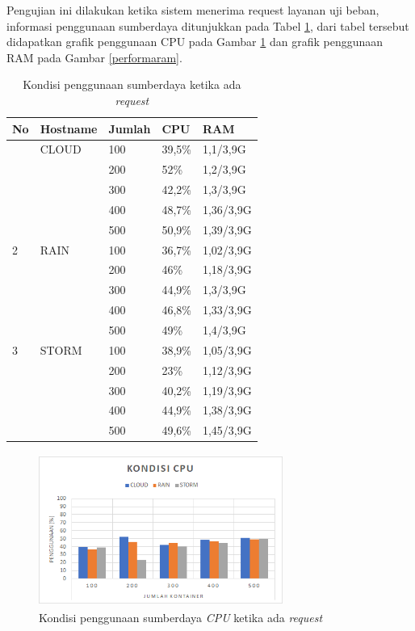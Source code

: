 				Pengujian ini dilakukan ketika sistem menerima request layanan uji beban, informasi penggunaan sumberdaya ditunjukkan pada Tabel \ref{sdhasilperforma}, dari tabel tersebut didapatkan grafik penggunaan CPU pada Gambar \ref{performacpu} dan grafik penggunaan RAM pada Gambar \ref{performaram}.
				\begin{longtable}{|p{}|p{}|p{}|p{}|p{}|}
					\caption{Kondisi penggunaan sumberdaya ketika ada \textit{request}} \label{sdhasilperforma} \\
					\hline
					\textbf{No} & \textbf{Hostname} & \textbf{Jumlah} & \textbf{CPU} & \textbf{RAM} \\ \hline
					\endhead
					\endfoot
					\endlastfoot
					1 & CLOUD & 100 & 39,5\% & 1,1/3,9G \\ \cline{3-5}
					&& 200 & 52\% & 1,2/3,9G \\ \cline{3-5}
					&& 300 & 42,2\% & 1,3/3,9G \\ \cline{3-5}
					&& 400 & 48,7\% & 1,36/3,9G \\ \cline{3-5}
					&& 500 & 50,9\% & 1,39/3,9G \\ \hline
					2 & RAIN & 100 & 36,7\% & 1,02/3,9G \\ \cline{3-5}
					&& 200 & 46\% & 1,18/3,9G \\ \cline{3-5}
					&& 300 & 44,9\% & 1,3/3,9G \\ \cline{3-5}
					&& 400 & 46,8\% & 1,33/3,9G \\ \cline{3-5}
					&& 500 & 49\% & 1,4/3,9G \\ \hline
					3 & STORM & 100 & 38,9\% & 1,05/3,9G \\ \cline{3-5}
					&& 200 & 23\% & 1,12/3,9G \\ \cline{3-5}
					&& 300 & 40,2\% & 1,19/3,9G \\ \cline{3-5}
					&& 400 & 44,9\% & 1,38/3,9G \\ \cline{3-5}
					&& 500 & 49,6\% & 1,45/3,9G \\ \hline
				\end{longtable}
			
				\begin{figure}[H]
					\centering
					\includegraphics[width=8cm,height=5cm]{Images/C-5/performacpu.png}
					\caption{Kondisi penggunaan sumberdaya \textit{CPU} ketika ada \textit{request}}
					\label{performacpu}
				\end{figure}
			

